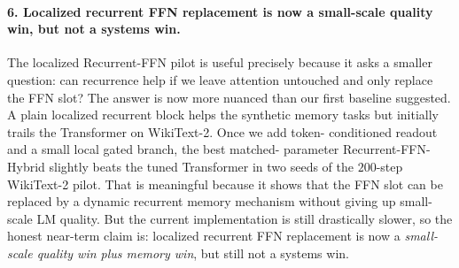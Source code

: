 \documentclass[11pt]{article}
\begin{document}
\paragraph{6. Localized recurrent FFN replacement is now a small-scale quality win, but not a systems win.}
The localized Recurrent-FFN pilot is useful precisely because it asks a
smaller question: can recurrence help if we leave attention untouched and only
replace the FFN slot? The answer is now more nuanced than our first baseline
suggested. A plain localized recurrent block helps the synthetic memory tasks
but initially trails the Transformer on WikiText-2. Once we add token-
conditioned readout and a small local gated branch, the best matched-
parameter Recurrent-FFN-Hybrid slightly beats the tuned Transformer in two
seeds of the $200$-step WikiText-2 pilot. That is meaningful because it shows
that the FFN slot can be replaced by a dynamic recurrent memory mechanism
without giving up small-scale LM quality. But the current implementation is
still drastically slower, so the honest near-term claim is: localized
recurrent FFN replacement is now a \emph{small-scale quality win plus memory
win}, but still not a systems win.
\end{document}
